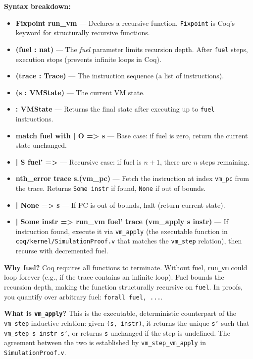 \textbf{Syntax breakdown:}
\begin{itemize}
    \item \textbf{Fixpoint run\_vm} — Declares a recursive function. \texttt{Fixpoint} is Coq's keyword for structurally recursive functions.
    \item \textbf{(fuel : nat)} — The \textit{fuel} parameter limits recursion depth. After \texttt{fuel} steps, execution stops (prevents infinite loops in Coq).
    \item \textbf{(trace : Trace)} — The instruction sequence (a list of instructions).
    \item \textbf{(s : VMState)} — The current VM state.
    \item \textbf{: VMState} — Returns the final state after executing up to \texttt{fuel} instructions.
    \item \textbf{match fuel with | O => s} — Base case: if fuel is zero, return the current state unchanged.
    \item \textbf{| S fuel' =>} — Recursive case: if fuel is $n+1$, there are $n$ steps remaining.
    \item \textbf{nth\_error trace s.(vm\_pc)} — Fetch the instruction at index \texttt{vm\_pc} from the trace. Returns \texttt{Some instr} if found, \texttt{None} if out of bounds.
    \item \textbf{| None => s} — If PC is out of bounds, halt (return current state).
    \item \textbf{| Some instr => run\_vm fuel' trace (vm\_apply s instr)} — If instruction found, execute it via \texttt{vm\_apply} (the executable function in \texttt{coq/kernel/SimulationProof.v} that matches the \texttt{vm\_step} relation), then recurse with decremented fuel.
\end{itemize}

\textbf{Why fuel?} Coq requires all functions to terminate. Without fuel, \texttt{run\_vm} could loop forever (e.g., if the trace contains an infinite loop). Fuel bounds the recursion depth, making the function structurally recursive on \texttt{fuel}. In proofs, you quantify over arbitrary fuel: \texttt{forall fuel, ...}.

\textbf{What is \texttt{vm\_apply}?} This is the executable, deterministic counterpart of the \texttt{vm\_step} inductive relation: given \texttt{(s, instr)}, it returns the unique \texttt{s'} such that \texttt{vm\_step s instr s'}, or returns \texttt{s} unchanged if the step is undefined. The agreement between the two is established by \texttt{vm\_step\_vm\_apply} in \texttt{SimulationProof.v}.

